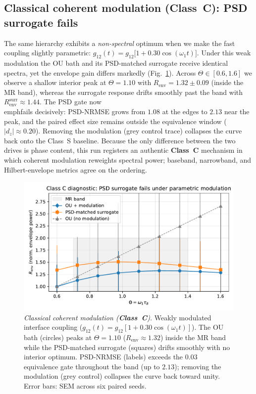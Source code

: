 \documentclass[11pt,letterpaper]{article}
\DeclareRobustCommand{\classC}{\textbf{Class~C}\xspace}
\begin{document}
\subsection{Classical coherent modulation (\classC): PSD surrogate fails}
The same hierarchy exhibits a \emph{non-spectral} optimum when we make the fast coupling slightly parametric: $g_{12}(t)=g_{12}\bigl[1+0.30\cos(\omega_1 t)\bigr]$. Under this weak modulation the OU bath and its PSD-matched surrogate receive identical spectra, yet the envelope gain differs markedly (Fig.~\ref{fig:classical_param}). Across $\Theta\in[0.6,1.6]$ we observe a shallow interior peak at $\Theta=1.10$ with $R_{\mathrm{env}}=1.32\pm0.09$ (inside the MR band), whereas the surrogate response drifts smoothly past the band with $R_{\mathrm{env}}^{\mathrm{surr}}\approx1.44$. The PSD gate now \\emph{fails} decisively: PSD-NRMSE grows from $1.08$ at the edges to $2.13$ near the peak, and the paired effect size remains outside the equivalence window ($|d_z|\approx0.20$). Removing the modulation (grey control trace) collapses the curve back onto the Class~S baseline. Because the only difference between the two drives is phase content, this run registers an authentic \classC{} mechanism in which coherent modulation reweights spectral power; baseband, narrowband, and Hilbert-envelope metrics agree on the ordering.

\begin{figure}[t]
\centering
\includegraphics[width=0.8\linewidth]{figD_parametric_classC.pdf}
\caption{\emph{Classical coherent modulation (\classC).} Weakly modulated interface coupling ($g_{12}(t)=g_{12}[1+0.30\cos(\omega_1 t)]$). The OU bath (circles) peaks at $\Theta=1.10$ ($R_{\mathrm{env}}\approx1.32$) inside the MR band while the PSD-matched surrogate (squares) drifts smoothly with no interior optimum. PSD-NRMSE (labels) exceeds the $0.03$ equivalence gate throughout the band (up to $2.13$); removing the modulation (grey control) collapses the curve back toward unity. Error bars: SEM across six paired seeds.}
\label{fig:classical_param}
\end{figure}
\end{document}
